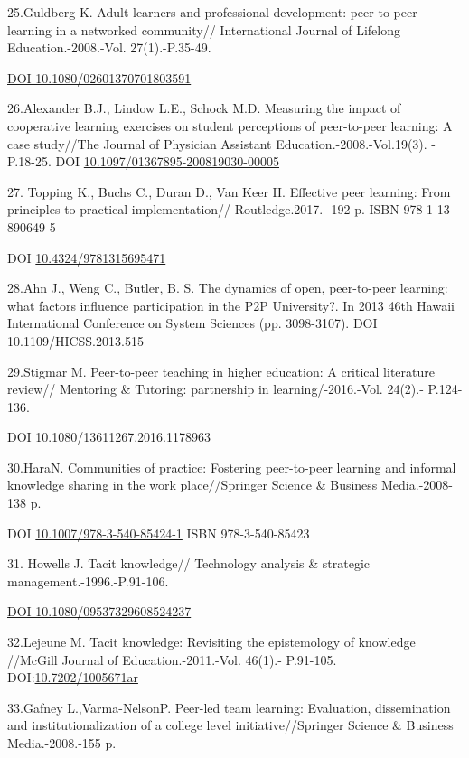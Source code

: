 25.Guldberg K. Adult learners and professional development: peer‐to‐peer
learning in a networked community// International Journal of Lifelong
Education.-2008.-Vol. 27(1).-P.35-49.

\href{https://doi.org/10.1080/02601370701803591}{DOI
10.1080/02601370701803591}

26.Alexander B.J., Lindow L.E., Schock M.D. Measuring the impact of
cooperative learning exercises on student perceptions of peer-to-peer
learning: A case study//The Journal of Physician Assistant
Education.-2008.-Vol.19(3). - P.18-25. DOI
\href{http://dx.doi.org/10.1097/01367895-200819030-00005}{10.1097/01367895-200819030-00005}

27. Topping K., Buchs C., Duran D., Van Keer H. Effective peer learning:
From principles to practical implementation// Routledge.2017.- 192 p.
ISBN 978-1-13-890649-5

DOI
\href{http://dx.doi.org/10.4324/9781315695471}{10.4324/9781315695471}

28.Ahn J., Weng C., Butler, B. S. The dynamics of open, peer-to-peer
learning: what factors influence participation in the P2P University?.
In 2013 46th Hawaii International Conference on System Sciences (pp.
3098-3107). DOI 10.1109/HICSS.2013.515

29.Stigmar M. Peer-to-peer teaching in higher education: A critical
literature review// Mentoring \& Tutoring: partnership in
learning/-2016.-Vol. 24(2).- P.124-136.

DOI 10.1080/13611267.2016.1178963

30.HaraN. Communities of practice: Fostering peer-to-peer learning and
informal knowledge sharing in the work place//Springer Science \&
Business Media.-2008-138 p.

DOI
\href{http://dx.doi.org/10.1007/978-3-540-85424-1}{10.1007/978-3-540-85424-1}
ISBN 978-3-540-85423

31. Howells J. Tacit knowledge// Technology analysis \& strategic
management.-1996.-P.91-106.

\href{https://doi.org/10.1080/09537329608524237}{DOI
10.1080/09537329608524237}

32.Lejeune M. Tacit knowledge: Revisiting the epistemology of knowledge
//McGill Journal of Education.-2011.-Vol. 46(1).- P.91-105.
DOI:\href{http://dx.doi.org/10.7202/1005671ar}{10.7202/1005671ar}

33.Gafney L.,Varma-NelsonP. Peer-led team learning: Evaluation,
dissemination and institutionalization of a college level
initiative//Springer Science \& Business Media.-2008.-155 p.

